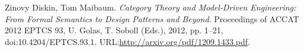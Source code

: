 \documentclass[12pt,a4paper]{ltxdoc}
\begin{document}
\begin{thebibliography}{9}
 Zinovy Diskin, Tom Maibaum. \emph{Category Theory and
    Model-Driven Engineering: From Formal Semantics to Design Patterns and Beyond}. Proceedings of ACCAT 2012
EPTCS 93, U. Golas, T. Soboll (Eds.), 2012, pp. 1–21, doi:10.4204/EPTCS.93.1. URL:\url{http://arxiv.org/pdf/1209.1433.pdf}.
\end{thebibliography}




\end{document}
